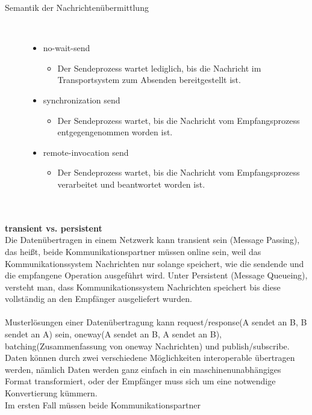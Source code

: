 \documentclass[a4paper,12pt]{article}
\begin{document}
\begin{description}
    \item[Semantik der Nachrichtenübermittlung] ~\par
    \begin{itemize}
        \item no-wait-send
        \begin{itemize}
            \item{Der Sendeprozess wartet lediglich, bis die Nachricht im Transportsystem zum Absenden bereitgestellt ist.}
        \end{itemize}
        \item synchronization send
        \begin{itemize}
            \item{Der Sendeprozess wartet, bis die Nachricht vom Empfangsprozess entgegengenommen worden ist.}
        \end{itemize}
        \item remote-invocation send
        \begin{itemize}
            \item{Der Sendeprozess wartet, bis die Nachricht vom Empfangsprozess verarbeitet und beantwortet worden ist.\\\\\\}
        \end{itemize}
    \end{itemize} 
\end{description}
\textbf{transient vs. persistent\\}
Die Datenübertragen in einem Netzwerk kann transient sein (Message Passing), das heißt, beide Kommunikationspartner müssen online sein, weil das Kommunikationssystem Nachrichten nur solange speichert, wie die
sendende und die empfangene Operation ausgeführt wird. Unter Persistent (Message Queueing), versteht man, dass Kommunikationssystem Nachrichten speichert bis diese vollständig an den Empfänger ausgeliefert wurden.\\\\
Musterlösungen einer Datenübertragung kann request/response(A sendet an B, B sendet an A) sein, oneway(A sendet an B, A sendet an B), batching(Zusammenfassung von oneway Nachrichten) und publish/subscribe. Daten können durch zwei verschiedene Möglichkeiten interoperable übertragen werden, nämlich Daten werden ganz einfach in ein maschinenunabhängiges Format transformiert, oder der Empfänger muss sich um eine notwendige Konvertierung kümmern.\\ Im ersten Fall müssen beide Kommunikationspartner
\end{document}
